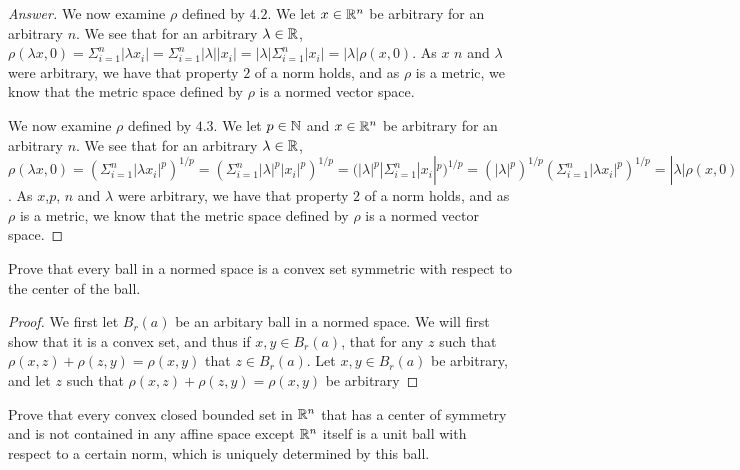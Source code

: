 \begin{proof}[Answer]
  We now examine $\rho$ defined by $4.2$. 
  We let $x\in \mathbb{R}^n$ be arbitrary for an arbitrary $n$. We see that 
  for an arbitrary $\lambda \in \mathbb{R}$, $\rho(\lambda x,0)=
  \Sigma_{i=1}^n|\lambda x_i| =
  \Sigma_{i=1}^n |\lambda| | x_i|=
  |\lambda| \Sigma_{i=1}^n | x_i|=
  |\lambda| \rho(x,0)$. As $x$  $n$ and $\lambda$ were arbitrary,
  we have that property $2$ of a norm holds, and as $\rho$ is a
  metric, we know that the metric space defined by $\rho$ is a normed
  vector space. 

  We now examine $\rho$ defined by $4.3$. 
  We let $p\in \mathbb{N}$ and $x\in \mathbb{R}^n$ be arbitrary
  for an arbitrary $n$. We see that 
  for an arbitrary $\lambda \in \mathbb{R}$, $\rho(\lambda x,0)=
  (\Sigma_{i=1}^n |\lambda x_i|^p)^{1/p} =
  (\Sigma_{i=1}^n |\lambda|^p |x_i|^p)^{1/p} =
 ( |\lambda|^p|\Sigma_{i=1}^n |x_i|^p)^{1/p} =
 ( |\lambda|^p)^{1/p}(\Sigma_{i=1}^n |\lambda x_i|^p)^{1/p} =
  |\lambda| \rho(x,0)$. As $x$,$p$, $n$ and $\lambda$ were arbitrary,
  we have that property $2$ of a norm holds, and as $\rho$ is a
  metric, we know that the metric space defined by $\rho$ is a normed
  vector space. 
\end{proof}

\begin{minorEx}%
    Prove that every ball in a normed space is a convex set symmetric with
    respect to the center of the ball.
\end{minorEx}

\begin{proof}
  We first let $B_r(a)$ be an arbitary ball in a normed space. We will
  first show that it is a convex set, and thus if $x,y\in B_r(a)$,
  that for any $z$ such that $\rho(x,z)+\rho(z,y)=\rho(x,y)$
  that $z\in B_r(a)$. Let $x,y\in B_r(a)$ be arbitrary, and let $z$
  such that $\rho(x,z)+\rho(z,y)=\rho(x,y)$ be arbitrary
\end{proof}

\begin{minorEx}
    Prove that every convex closed bounded set in $\mathbb{R}^n$ that has a center of
    symmetry and is not contained in any affine space except $\mathbb{R}^n$ itself is a
    unit ball with respect to a certain norm, which is uniquely determined by
    this ball.
\end{minorEx}
